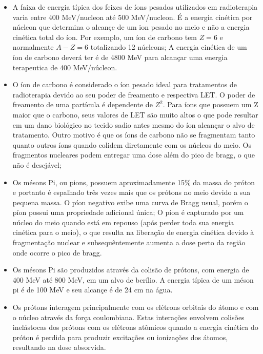 \documentclass[11pt,a4paper]{article}
\newcounter{exemplo}
\begin{document}
\begin{exemplo}
\begin{itemize}
        \item A faixa de energia típica dos feixes de íons pesados utilizados em radioterapia varia entre 400 MeV/nucleon até 500 MeV/nucleon. É a energia cinética por núcleon que determina o alcançe de um ion pesado no meio e não a energia cinética total do íon. Por exemplo, um íon de carbono tem $Z = 6$ e normalmente $A - Z = 6$ totalizando 12 núcleons; A energia cinética de um íon de carbono deverá ter é de 4800 MeV para alcançar uma energia terapeutica de 400 MeV/núcleon.
        
        \item O íon de carbono é considerado o íon pesado ideal para tratamentos de radioterapia devido ao seu poder de freamento e respectiva LET. O poder de freamento de uma partícula é dependente de $Z^2$. Para íons que possuem um Z  maior que o carbono, seus valores de LET são muito altos o que pode resultar em um dano biológico no tecido sadio antes mesmo do íon alcançar o alvo de tratamento. Outro motivo é que os íons de carbono não se fragmentam tanto quanto outros íons quando colidem diretamente com os núcleos do meio. Os fragmentos nucleares podem entregar uma dose além do pico de bragg, o que não é desejável;

        \item Os mésons Pi, ou pions, possuem aproximadamente 15\% da massa do próton e portanto é espalhado três vezes mais que os prótons no meio devido a sua pequena massa. O píon negativo exibe uma curva de Bragg usual, porém o píon possui uma propriedade adicional única; O píon é capturado por um núcleo do meio quando está em repouso (após perder toda sua energia cinética para o meio), o que resulta na liberação de energia cinética devido à fragmentação nuclear e subsequêntemente aumenta a dose perto da região onde ocorre o pico de bragg.
        
        \item Os mésons Pi são produzidos através da colisão de prótons, com energia de 400 MeV até 800 MeV, em um alvo de berílio. A energia típica de um méson pi é de 100 MeV e seu alcançe é de 24 cm na água.
        
        \item Os prótons interagem principalmente com os elétrons orbitais do átomo e com o núcleo através da força coulombiana. Estas interações envolvem colisões inelástocas dos prótons com os elétrons atômicos quando a energia cinética do próton é perdida para produzir excitações ou ionizações dos átomos, resultando na dose absorvida.
        

\end{itemize}
\end{exemplo}
\end{document}
